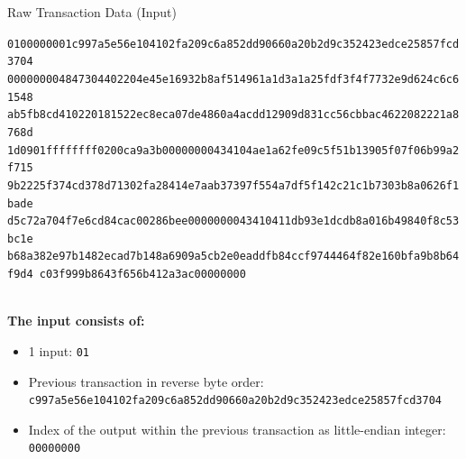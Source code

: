 \documentclass[handout]{beamer}
\begin{document}
\begin{frame}{Raw Transaction Data (Input)}
\begin{scriptsize}
\texttt{\textcolor{black!30}{01000000}{\alert<2>{01}\alert<3>{c997a5e56e104102fa209c6a852dd90660a20b2d9c352423edce25857fcd3704}
\alert<4>{00000000}}\textcolor{black!30}{4847304402204e45e16932b8af514961a1d3a1a25fdf3f4f7732e9d624c6c61548
ab5fb8cd410220181522ec8eca07de4860a4acdd12909d831cc56cbbac4622082221a8768d
1d0901ffffffff0200ca9a3b00000000434104ae1a62fe09c5f51b13905f07f06b99a2f715
9b2225f374cd378d71302fa28414e7aab37397f554a7df5f142c21c1b7303b8a0626f1bade
d5c72a704f7e6cd84cac00286bee0000000043410411db93e1dcdb8a016b49840f8c53bc1e
b68a382e97b1482ecad7b148a6909a5cb2e0eaddfb84ccf9744464f82e160bfa9b8b64f9d4
c03f999b8643f656b412a3ac00000000}}
\end{scriptsize}
\vspace{1em}
\scriptsize \\
\textbf{The input consists of:}\\
\begin{itemize}
	\item \alert<2>{1 input: \texttt{01}}
	\item \alert<3>{Previous transaction in reverse byte order: \texttt{c997a5e56e104102fa209c6a852dd90660a20b2d9c352423edce25857fcd3704}}
	\item \alert<4>{Index of the output within the previous transaction as little-endian integer: \texttt{00000000}}
\end{itemize}
\end{frame}
\end{document}
